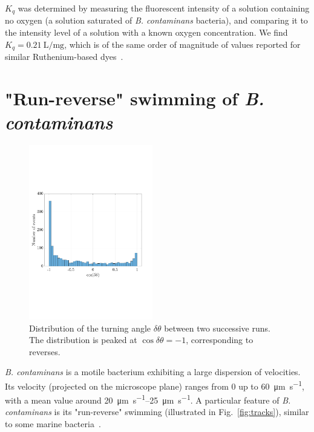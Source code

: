 \documentclass[aps,a4paper,twocolumn,10pt,pre,showpacs]{revtex4-2}
\begin{document}
$K_q$ was determined by measuring the fluorescent intensity of a solution containing no oxygen (a solution saturated of \emph{B. contaminans} bacteria), and comparing it to the intensity level of a solution with a known oxygen concentration. We find $K_q=\SI{0.21}{\liter\per\mg}$, which is of the same order of magnitude of values reported for similar Ruthenium-based  dyes~\cite{gerritsen1997fluorescence,sud2006time,polinkovsky2009fine,kim2016oxygen,Adler2012,menolascina2017logarithmic}.



\section{"Run-reverse" swimming of \emph{B. contaminans}}
\label{sec:SM_run-reverse}

\begin{figure}[b]
\includegraphics[trim = 5mm 72mm 18mm 79mm, clip, width=0.48\textwidth, angle=0]{FigAB.pdf} 
\caption{Distribution of the turning angle $\delta\theta$ between two successive runs. The distribution is peaked at $\cos\delta\theta=-1$, corresponding to reverses.}
\label{fig:SM_turning_angle_distri}
\end{figure}

\emph{B. contaminans} is a motile bacterium exhibiting a large dispersion of velocities. Its velocity (projected on the microscope plane) ranges from 0 up to \SI{60}{\um\per\s}, with a mean value around \SIrange{20}{25}{\um\per\s}. A particular feature of \emph{B. contaminans} is its "run-reverse" swimming (illustrated in Fig.~\ref{fig:tracks}), similar to some marine bacteria~\cite{barbara2003bacterial,taktikos2013motility}. 
\end{document}
